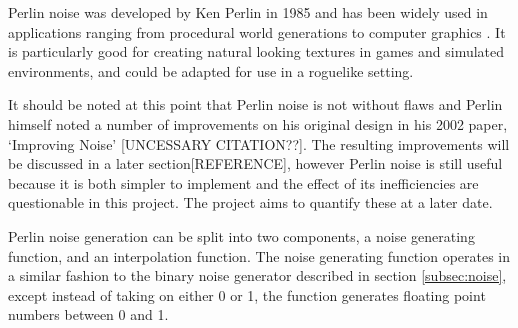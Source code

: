 \documentclass[12pt,a4paper]{article}
\begin{document}
Perlin noise was developed by Ken Perlin in 1985 and has been widely used in applications ranging from procedural world generations to computer graphics \cite{imagesynth} \cite{surveyPNF}. It is particularly good for creating natural looking textures in games and simulated environments, and could be adapted for use in a roguelike setting.

It should be noted at this point that Perlin noise is not without flaws and Perlin himself noted a number of improvements on his original design in his 2002 paper, `Improving Noise' \cite{improvepnoise}[UNCESSARY CITATION??]. The resulting improvements will be discussed in a later section[REFERENCE], however Perlin noise is still useful because it is both simpler to implement and the effect of its inefficiencies are questionable in this project. The project aims to quantify these at a later date.







Perlin noise generation can be split into two components, a noise generating function, and an interpolation function. The noise generating function operates in a similar fashion to the binary noise generator described in section \ref{subsec:noise}, except instead of taking on either 0 or 1, the function generates floating point numbers between 0 and 1. 
\end{document}
